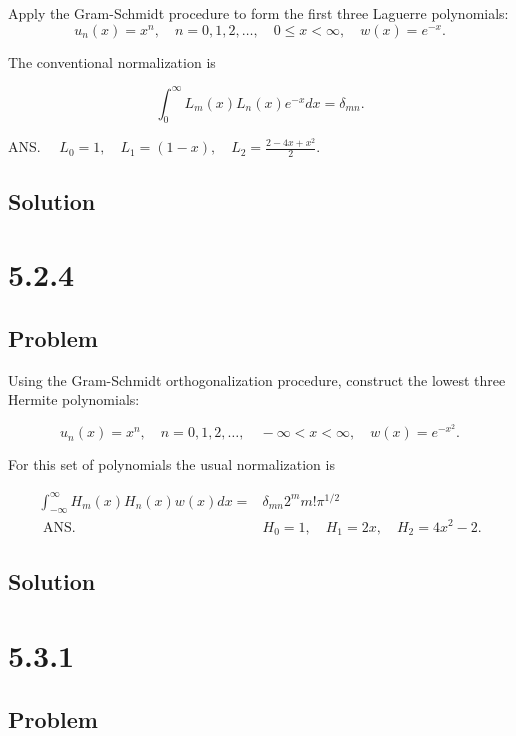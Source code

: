 \documentclass[12pt]{article}
\begin{document}
Apply the Gram-Schmidt procedure to form the first three Laguerre polynomials:
\[
    u_n(x)=x^n, \quad n=0,1,2, \ldots, \quad 0 \leq x<\infty, \quad w(x)=e^{-x} .
\]

The conventional normalization is

\[
    \int_0^{\infty} L_m(x) L_n(x) e^{-x} d x=\delta_{m n} .
\]

ANS. \(\quad L_0=1, \quad L_1=(1-x), \quad L_2=\frac{2-4 x+x^2}{2}\).

\subsection{Solution}

\newpage
\section{5.2.4}

\subsection{Problem}

Using the Gram-Schmidt orthogonalization procedure, construct the lowest three Hermite polynomials:

\[
    u_n(x)=x^n, \quad n=0,1,2, \ldots, \quad-\infty<x<\infty, \quad w(x)=e^{-x^2} .
\]

For this set of polynomials the usual normalization is

\[
    \begin{aligned}
        \int_{-\infty}^{\infty} H_m(x) H_n(x) w(x) d x= & \delta_{m n} 2^m m!\pi^{1 / 2}            \\
        \text { ANS. }                                  & H_0=1, \quad H_1=2 x, \quad H_2=4 x^2-2 .
    \end{aligned}
\]

\subsection{Solution}

\newpage
\section{5.3.1}

\subsection{Problem}
\end{document}
